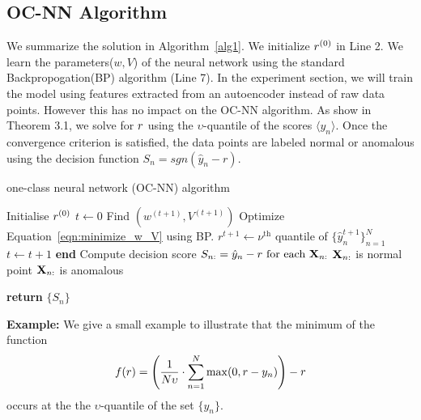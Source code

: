 \subsection{OC-NN Algorithm}
\label{sec:algorithm}
We summarize the solution in Algorithm~\ref{alg1}. We initialize $r^{(0)}$ in Line 2. We learn the parameters($w,V$) of the neural network
using the standard Backpropogation(BP) algorithm (Line 7). In the experiment section, we will train the model using features extracted from
an autoencoder instead of raw data points. However this has no impact on the OC-NN algorithm. As show  in Theorem 3.1, we solve for $r$
using the $\upsilon$-quantile of the scores $\langle y_{n} \rangle$. Once the convergence criterion is satisfied, the data points are
labeled normal or anomalous using the decision function $S_{n} = sgn(\hat{y}_{n} - r)$.

\begin{algorithm}
\caption{one-class neural network (OC-NN) algorithm}\label{alg:oc-nn}
\label{alg1}
\begin{algorithmic}[1]

\State Initialise $r^{(0)}$
\State $t \gets 0$
\State Find $(w^{(t+1)}, V^{(t+1)})$ \Comment Optimize Equation~\ref{eqn:minimize_w_V} using BP.
\State $r^{t+1} \gets \nu^{\text{th}}$ quantile of $\{ \hat{y}_n^{t+1} \}_{n = 1}^N$
\State $t \gets t + 1$
\EndWhile \label{endwhile}
\State \textbf{end}
\State Compute decision score $S_{n :}=  \hat{y}_n -r  \mbox{ for each }  \mathbf{X}_{n :}$
    \State $\mathbf{X}_{n :}$ is normal point
   \Else
    \State $\mathbf{X}_{n :}$ is anomalous
\EndIf

\State \textbf{return} $\{S_n\}$

\end{algorithmic}
\end{algorithm}
%
\noindent
{\bf Example:} We give a small example to illustrate that the minimum of the function
\[f(r) =  \left( \frac{1}{N\upsilon} \cdot \sum_{n = 1}^N \max( 0, r - y_n ) \right) - r\] occurs at the
the $\upsilon$-quantile of the set $\{y_{n}\}$. \\

